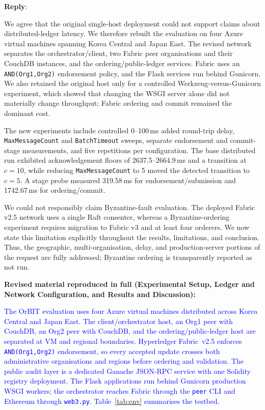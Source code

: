 \documentclass[11pt]{article}
\newcommand{\reply}{\medskip \noindent \textbf{Reply}:\ }
\begin{document}
\reply{We agree that the original single-host deployment could not support
claims about distributed-ledger latency. We therefore rebuilt the evaluation on
four Azure virtual machines spanning Korea Central and Japan East. The revised
network separates the orchestrator/client, two Fabric peer organisations and
their CouchDB instances, and the ordering/public-ledger services. Fabric uses an
\texttt{AND(Org1,Org2)} endorsement policy, and the Flask services run behind
Gunicorn. We also retained the original host only for a controlled
Werkzeug-versus-Gunicorn experiment, which showed that changing the WSGI server
alone did not materially change throughput; Fabric ordering and commit remained
the dominant cost.

The new experiments include controlled 0--100\,ms added round-trip delay,
\texttt{MaxMessageCount} and \texttt{BatchTimeout} sweeps, separate endorsement
and commit-stage measurements, and five repetitions per configuration. The
base distributed run exhibited acknowledgement floors of 2637.5--2664.9\,ms
and a transition at $c=10$, while reducing
\texttt{MaxMessageCount} to 5 moved the detected transition to $c=5$. A stage
probe measured 319.58\,ms for endorsement/submission and 1742.67\,ms for
ordering/commit.

We could not responsibly claim Byzantine-fault evaluation. The deployed Fabric
v2.5 network uses a single Raft consenter, whereas a Byzantine-ordering
experiment requires migration to Fabric v3 and at least four orderers. We now
state this limitation explicitly throughout the results, limitations, and
conclusion. Thus, the geographic, multi-organisation, delay, and
production-server portions of the request are fully addressed; Byzantine
ordering is transparently reported as not run.}

\medskip
\noindent\textbf{Revised material reproduced in full (Experimental Setup, Ledger and
Network Configuration, and Results and Discussion):}

\textcolor{blue}{The OrBIT evaluation uses four Azure virtual machines distributed across Korea Central and Japan East. The client/orchestrator host, an Org1 peer with CouchDB, an Org2 peer with CouchDB, and the ordering/public-ledger host are separated at VM and regional boundaries. Hyperledger Fabric~v2.5 enforces \texttt{AND(Org1,Org2)} endorsement, so every accepted update crosses both administrative organisations and regions before ordering and validation. The public audit layer is a dedicated Ganache JSON-RPC service with one Solidity registry deployment. The Flask applications run behind Gunicorn production WSGI workers; the orchestrator reaches Fabric through the \texttt{peer} CLI and Ethereum through \texttt{web3.py}. Table~\ref{tab:env} summarises the testbed.}
\end{document}

